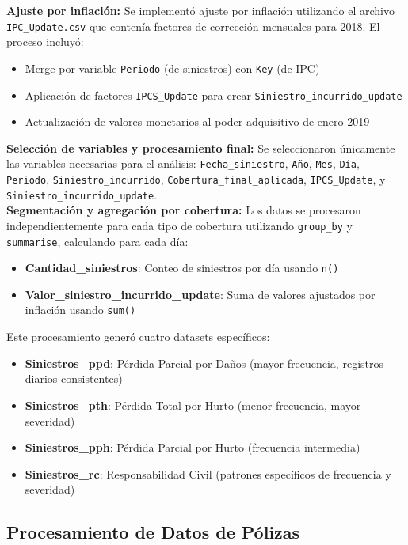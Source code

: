 \textbf{Ajuste por inflación:} Se implementó ajuste por inflación utilizando el archivo \texttt{IPC\_Update.csv} que contenía factores de corrección mensuales para 2018. El proceso incluyó:
\begin{itemize}
    \item Merge por variable \texttt{Periodo} (de siniestros) con \texttt{Key} (de IPC)
    \item Aplicación de factores \texttt{IPCS\_Update} para crear \texttt{Siniestro\_incurrido\_update}
    \item Actualización de valores monetarios al poder adquisitivo de enero 2019
\end{itemize}

\textbf{Selección de variables y procesamiento final:} Se seleccionaron únicamente las variables necesarias para el análisis: \texttt{Fecha\_siniestro}, \texttt{Año}, \texttt{Mes}, \texttt{Día}, \texttt{Periodo}, \texttt{Siniestro\_incurrido}, \texttt{Cobertura\_final\_aplicada}, \texttt{IPCS\_Update}, y \texttt{Siniestro\_incurrido\_update}.\\

\textbf{Segmentación y agregación por cobertura:} Los datos se procesaron independientemente para cada tipo de cobertura utilizando \texttt{group\_by} y \texttt{summarise}, calculando para cada día:
\begin{itemize}
    \item \textbf{Cantidad\_siniestros}: Conteo de siniestros por día usando \texttt{n()}
    \item \textbf{Valor\_siniestro\_incurrido\_update}: Suma de valores ajustados por inflación usando \texttt{sum()}
\end{itemize}

Este procesamiento generó cuatro datasets específicos:
\begin{itemize}
    \item \textbf{Siniestros\_ppd}: Pérdida Parcial por Daños (mayor frecuencia, registros diarios consistentes)
    \item \textbf{Siniestros\_pth}: Pérdida Total por Hurto (menor frecuencia, mayor severidad)
    \item \textbf{Siniestros\_pph}: Pérdida Parcial por Hurto (frecuencia intermedia)
    \item \textbf{Siniestros\_rc}: Responsabilidad Civil (patrones específicos de frecuencia y severidad)
\end{itemize}

\subsection{Procesamiento de Datos de Pólizas}

